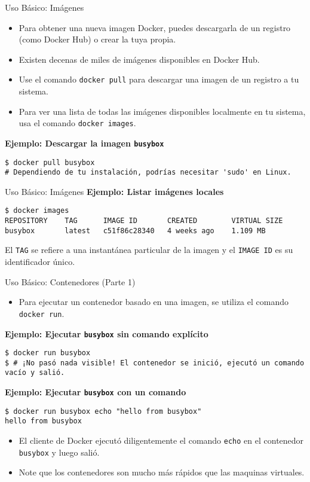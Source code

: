 \documentclass[aspectratio=169]{beamer} %
\begin{document}
\begin{frame}[containsverbatim]{Uso Básico: Imágenes}
    \begin{itemize}
        \item Para obtener una nueva imagen Docker, puedes descargarla de un registro (como Docker Hub) o crear la tuya propia.
        \item Existen decenas de miles de imágenes disponibles en Docker Hub.
        \item  Use el comando \texttt{docker pull} para descargar una imagen de un registro a tu sistema.
        \item Para ver una lista de todas las imágenes disponibles localmente en tu sistema, usa el comando \texttt{docker images}.
    \end{itemize}
    \vspace{0.5cm}
    \textbf{Ejemplo: Descargar la imagen \texttt{busybox}}
    \begin{verbatim}
$ docker pull busybox
# Dependiendo de tu instalación, podrías necesitar 'sudo' en Linux.
    \end{verbatim}
\end{frame}
\begin{frame}[containsverbatim]{Uso Básico: Imágenes}
    \textbf{Ejemplo: Listar imágenes locales}
    \begin{verbatim}
$ docker images
REPOSITORY    TAG      IMAGE ID       CREATED        VIRTUAL SIZE
busybox       latest   c51f86c28340   4 weeks ago    1.109 MB
    \end{verbatim}
    El \texttt{TAG} se refiere a una instantánea particular de la imagen y el \texttt{IMAGE ID} es su identificador único.
\end{frame}

\begin{frame}[containsverbatim]{Uso Básico: Contenedores (Parte 1)}
    \begin{itemize}
        \item Para ejecutar un contenedor basado en una imagen, se utiliza el comando \texttt{docker run}.
    \end{itemize}
    \vspace{0.5cm}
    \textbf{Ejemplo: Ejecutar \texttt{busybox} sin comando explícito}
    \begin{verbatim}
$ docker run busybox
$ # ¡No pasó nada visible! El contenedor se inició, ejecutó un comando vacío y salió.
    \end{verbatim}
    \vspace{0.5cm}
    \textbf{Ejemplo: Ejecutar \texttt{busybox} con un comando}
    \begin{verbatim}
$ docker run busybox echo "hello from busybox"
hello from busybox
    \end{verbatim}
    \begin{itemize}
        \item El cliente de Docker ejecutó diligentemente el comando \texttt{echo} en el contenedor \texttt{busybox} y luego salió.
        \item Note que los contenedores son mucho más rápidos que las maquinas virtuales.
    \end{itemize}
\end{frame}
\end{document}
